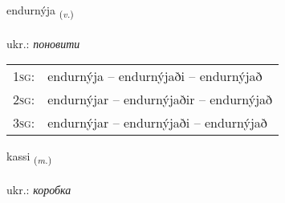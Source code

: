 \documentclass[frontgrid, backgrid]{flacards}\usepackage[]{graphicx}\usepackage[]{xcolor}
\begin{document}
\renewcommand{\flhead}{\vskip5pt \fboxsep=0pt {\small\bfseries\footnotesize Sagnorð | дієслово}}
\renewcommand{\fcfoot}{\vskip5pt \fboxsep=0pt \hspace{2pt}{\small\bfseries\footnotesize 3K}}

\renewcommand{\blhead}{\vskip5pt {\small\bfseries\footnotesize Sagnorð | дієслово }}
\renewcommand{\bcfoot}{\vskip5pt \hspace{2pt}{\small\bfseries\footnotesize 3K}}


{endurnýja \small{\textsubscript{(\textit{v.})}} \\[1ex] %
\textphonetic{[ɛntʏrnija]} \\
ukr.: \emph{поновити} \\  [2ex]
\renewcommand*{\arraystretch}{0.8}
\begin{tabular}{p{1cm}l}
\textsc{1sg}: & endurnýja -- endurnýjaði -- endurnýjað \\ 
\textsc{2sg}: & endurnýjar -- endurnýjaðir -- endurnýjað \\ 
\textsc{3sg}: & endurnýjar -- endurnýjaði -- endurnýjað \\ 
\end{tabular}
}

\renewcommand{\flhead}{\vskip5pt \fboxsep=0pt {\small\bfseries\footnotesize Nafnorð | іменник}}
\renewcommand{\fcfoot}{\vskip5pt \fboxsep=0pt \hspace{2pt}{\small\bfseries\footnotesize 3K}}

\renewcommand{\blhead}{\vskip5pt {\small\bfseries\footnotesize Nafnorð | іменник }}
\renewcommand{\bcfoot}{\vskip5pt \hspace{2pt}{\small\bfseries\footnotesize 3K}}


{kassi \small{\textsubscript{(\textit{m.})}} \\[1ex] %
\textphonetic{[kʰasɪ]} \\
ukr.: \emph{коробка} \\  [2ex]
\renewcommand*{\arraystretch}{0.8}
}
\end{document}
